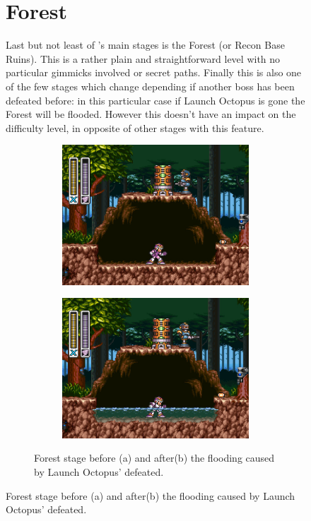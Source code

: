 \begin{figure}[htp]
\section{Forest}
Last but not least of \x's main stages is the Forest (or Recon Base Ruins). This is a rather plain and straightforward level with no particular gimmicks involved or secret paths. Finally this is also one of the few stages which change depending if another boss has been defeated before: in this particular case if Launch Octopus is gone the Forest will be flooded. However this doesn't have an impact on the difficulty level, in opposite of other stages with this feature.

\begin{figure}[htp]
	\centering
	\begin{subfigure}{0.4\linewidth}
		\centering
		\includegraphics[width=\linewidth]{figures/X1/Sting_chameleon/Sting_no_water.jpg}
		\caption{}
	\end{subfigure}
	\begin{subfigure}{0.4\linewidth}
		\centering
		\includegraphics[width=\linewidth]{figures/X1/Sting_chameleon/Sting_water.jpg}
		\caption{}
	\end{subfigure}
	\caption{Forest stage before (a) and after(b) the flooding caused by Launch Octopus' defeated.}
\end{figure}


\end{figure}

